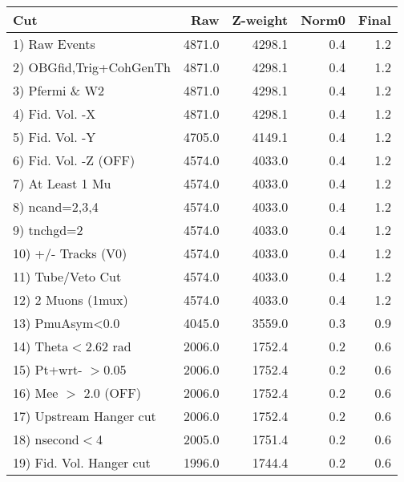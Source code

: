  \begin{table}[h!]\centering
 \begin{tabular}{||l||r|r|r|r||}
 \hline
 \hline
 Cut & Raw & Z-weight & Norm0 & Final \\
 \hline
  1) Raw Events           &      4871.0 &      4298.1 &         0.4 &         1.2 \\
  2) OBGfid,Trig+CohGenTh &      4871.0 &      4298.1 &         0.4 &         1.2 \\
  3) Pfermi \& W2         &      4871.0 &      4298.1 &         0.4 &         1.2 \\
  4) Fid. Vol. -X         &      4871.0 &      4298.1 &         0.4 &         1.2 \\
  5) Fid. Vol. -Y         &      4705.0 &      4149.1 &         0.4 &         1.2 \\
  6) Fid. Vol. -Z (OFF)   &      4574.0 &      4033.0 &         0.4 &         1.2 \\
  7) At Least 1 Mu        &      4574.0 &      4033.0 &         0.4 &         1.2 \\
  8) ncand=2,3,4          &      4574.0 &      4033.0 &         0.4 &         1.2 \\
  9) tnchgd=2             &      4574.0 &      4033.0 &         0.4 &         1.2 \\
 10) +/- Tracks (V0)      &      4574.0 &      4033.0 &         0.4 &         1.2 \\
 11) Tube/Veto Cut        &      4574.0 &      4033.0 &         0.4 &         1.2 \\
 12) 2 Muons (1mux)       &      4574.0 &      4033.0 &         0.4 &         1.2 \\
 13) PmuAsym<0.0          &      4045.0 &      3559.0 &         0.3 &         0.9 \\
 14) Theta$<$2.62 rad     &      2006.0 &      1752.4 &         0.2 &         0.6 \\
 15) Pt+wrt- $>$0.05      &      2006.0 &      1752.4 &         0.2 &         0.6 \\
 16) Mee $>$ 2.0  (OFF)   &      2006.0 &      1752.4 &         0.2 &         0.6 \\
 17) Upstream Hanger cut  &      2006.0 &      1752.4 &         0.2 &         0.6 \\
 18) nsecond$<$4          &      2005.0 &      1751.4 &         0.2 &         0.6 \\
 19) Fid. Vol. Hanger cut &      1996.0 &      1744.4 &         0.2 &         0.6 \\

\end{tabular}
\end{table}
